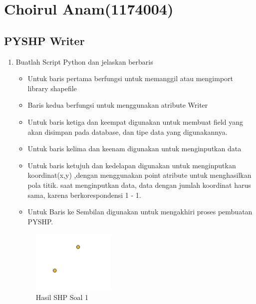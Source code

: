 \section{Choirul Anam(1174004)}
\subsection{PYSHP Writer}
\begin{enumerate}
	\item Buatlah Script Python dan jelaskan berbaris
	
	\begin{itemize}
		\item Untuk baris pertama berfungsi untuk memanggil atau mengimport  library shapefile
		\item Baris kedua berfungsi untuk menggunakan atribute Writer
		\item Untuk baris ketiga dan keempat digunakan untuk membuat field yang akan disimpan pada database, dan tipe data yang digunakannya.
		\item Untuk baris kelima dan keenam digunakan untuk menginputkan data
		\item Untuk baris ketujuh dan kedelapan digunakan untuk menginputkan koordinat(x,y) ,dengan menggunakan point atribute untuk menghasilkan pola titik. \hfill\break
		saat menginputkan data, data dengan jumlah koordinat harus sama, karena berkorespondensi 1 - 1.
		\item Untuk Baris ke Sembilan digunakan untuk mengakhiri proses pembuatan PYSHP.
	\end{itemize}
	\hfill\break
	\begin{figure}[H]
		\includegraphics[width=4cm]{figures/1174004/2/1.png}
		\centering
		\caption{Hasil SHP Soal 1}
	\end{figure}


\end{enumerate}
